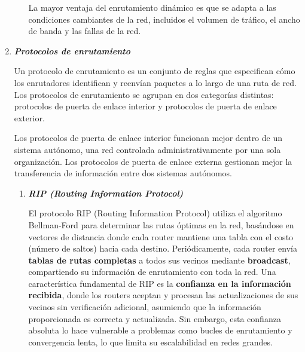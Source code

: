 \documentclass[12pt]{amsart}
\begin{document}
\begin{enumerate}
\begin{enumerate}
La mayor ventaja del enrutamiento dinámico es que se adapta a las condiciones cambiantes de la red, incluidos el volumen de tráfico, el ancho de banda y las fallas de la red.

						\bigskip\bigskip

			\end{enumerate}
		
		\bigskip\bigskip

		\item \textbf{\textit{Protocolos de enrutamiento}}
		
		\medskip
		\noindent Un protocolo de enrutamiento es un conjunto de reglas que especifican cómo los enrutadores identifican y reenvían paquetes a lo largo de una ruta de red. Los protocolos de enrutamiento se agrupan en dos categorías distintas: protocolos de puerta de enlace interior y protocolos de puerta de enlace exterior.

Los protocolos de puerta de enlace interior funcionan mejor dentro de un sistema autónomo, una red controlada administrativamente por una sola organización. Los protocolos de puerta de enlace externa gestionan mejor la transferencia de información entre dos sistemas autónomos.

			\begin{enumerate}
						\bigskip\bigskip

						\item \textbf{\textit{RIP (Routing Information Protocol)}}
						
						\medskip
						\noindent El protocolo RIP (Routing Information Protocol) utiliza el algoritmo Bellman-Ford para determinar las rutas óptimas en la red, basándose en vectores de distancia donde cada router mantiene una tabla con el costo (número de saltos) hacia cada destino. Periódicamente, cada router envía \textbf{tablas de rutas completas} a todos sus vecinos mediante \textbf{broadcast}, compartiendo su información de enrutamiento con toda la red. Una característica fundamental de RIP es la \textbf{confianza en la información recibida}, donde los routers aceptan y procesan las actualizaciones de sus vecinos sin verificación adicional, asumiendo que la información proporcionada es correcta y actualizada. Sin embargo, esta confianza absoluta lo hace vulnerable a problemas como bucles de enrutamiento y convergencia lenta, lo que limita su escalabilidad en redes grandes.	
						\bigskip\bigskip


\end{enumerate}
\end{enumerate}
\end{document}
